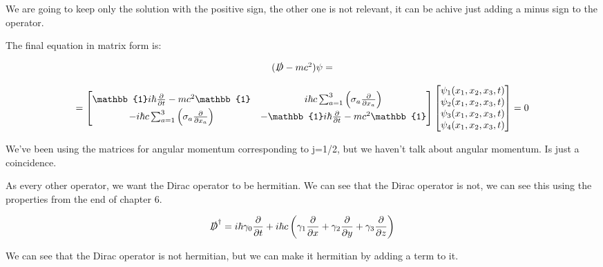 We are going to keep only the solution with the positive sign, the other one is not relevant, it can be achive just adding a minus sign to the operator.


The final equation in matrix form is:

\begin{equation}
  \begin{array}{c}
    (\slashed{D}-mc^2)\psi =
    \\

    \\
    = \begin{bmatrix}
      \mathbb{1} i\hbar \frac{\partial }{\partial t} - mc^2 \mathbb{1} & i\hbar c\sum_{a=1}^{3}\left(\sigma_a\frac{\partial}{\partial x_a}\right)\\
      -i\hbar c\sum_{a=1}^{3}\left(\sigma_a\frac{\partial}{\partial x_a}\right) & -\mathbb{1} i\hbar \frac{\partial }{\partial t} - mc^2 \mathbb{1}
    \end{bmatrix}\begin{bmatrix}
      \psi_1(x_1,x_2,x_3,t)\\
      \psi_2(x_1,x_2,x_3,t)\\
      \psi_3(x_1,x_2,x_3,t)\\
      \psi_4(x_1,x_2,x_3,t)
    \end{bmatrix} = 0
  \end{array}
\end{equation}

We've been using the matrices for angular momentum corresponding to j=1/2, but we haven't talk about angular momentum. Is just a coincidence.

As every other operator, we want the Dirac operator to be hermitian. We can see that the Dirac operator is not, we can see this using the properties from the end of chapter 6.

\begin{equation}
  \slashed{D}^{\dagger} = i\hbar \gamma_0 \frac{\partial}{\partial t} + i\hbar c \left(\gamma_1 \frac{\partial}{\partial x}+\gamma_2 \frac{\partial}{\partial y}+\gamma_3 \frac{\partial}{\partial z}\right)
\end{equation}

We can see that the Dirac operator is not hermitian, but we can make it hermitian by adding a term to it.

